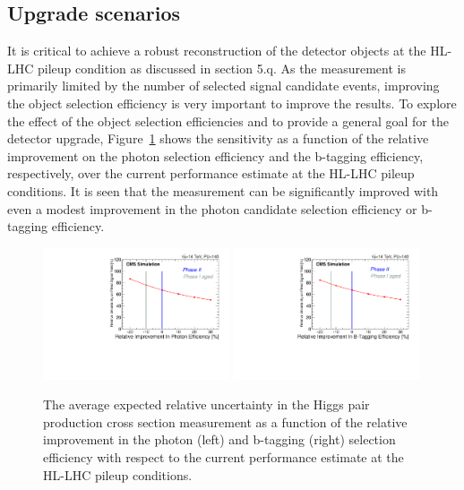 \subsection{Upgrade scenarios}
\label{sec:scenarios}

It is critical to achieve a robust reconstruction of the detector objects at the HL-LHC pileup condition as discussed in section 5.q. As the measurement is primarily limited by the number of selected signal candidate events, improving the object selection efficiency is very important to improve the results. To explore the effect of the object selection efficiencies and to provide a general goal for the detector upgrade, Figure~\ref{fig:PhotonEffImprovementScan} shows the sensitivity as a function of the relative improvement on the photon selection efficiency and the b-tagging efficiency, respectively, over the current performance estimate at the HL-LHC pileup conditions. It is seen that the measurement can be significantly improved with even a modest improvement in the photon candidate selection efficiency or b-tagging efficiency. 

\begin{figure}[h]
  \centering
  \includegraphics[width=0.49\textwidth]{figures_chapter6/XSUncertaintyVsPhotonEffRatio.pdf}
  \includegraphics[width=0.49\textwidth]{figures_chapter6/XSUncertaintyVsBtagEffRatio.pdf}
  \caption{ The average expected relative uncertainty in the Higgs pair production cross section measurement as a function of the relative improvement in the photon (left) and b-tagging (right) selection efficiency with respect to the current performance estimate at the HL-LHC pileup conditions.}
  \label{fig:PhotonEffImprovementScan}
\end{figure}


